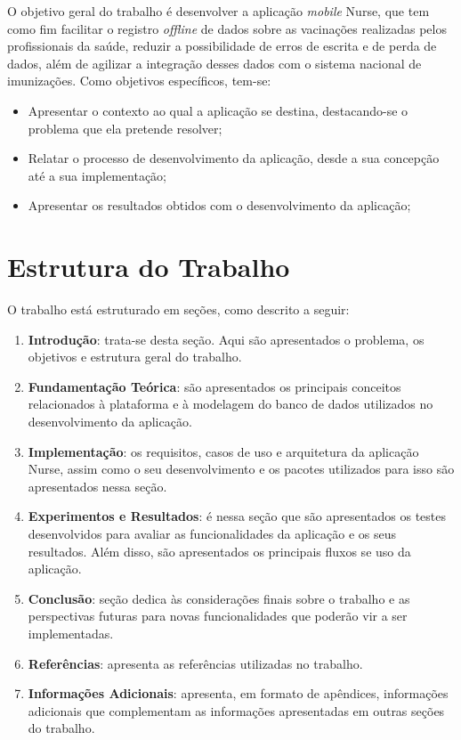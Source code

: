 O objetivo geral do trabalho é desenvolver a aplicação \textit{mobile} Nurse, que tem como fim facilitar o registro \textit{offline} de dados sobre as vacinações realizadas pelos profissionais da saúde, reduzir a possibilidade de erros de escrita e de perda de dados, além de agilizar a integração desses dados com o sistema nacional de imunizações. Como objetivos específicos, tem-se:
\begin{itemize}
  \item Apresentar o contexto ao qual a aplicação se destina, destacando-se o problema que ela pretende resolver;
  \item Relatar o processo de desenvolvimento da aplicação, desde a sua concepção até a sua implementação;
  \item Apresentar os resultados obtidos com o desenvolvimento da aplicação;
\end{itemize}

\section{Estrutura do Trabalho}
\label{cap1:Sec:EstruturaTrabalho}

O trabalho está estruturado em seções, como descrito a seguir: 


  \begin{enumerate}[label=\textbf{Seção \arabic*}]
    \item \textbf{Introdução}: trata-se desta seção. Aqui são apresentados o problema, os objetivos e estrutura geral do trabalho.
    \item \textbf{Fundamentação Teórica}: são apresentados os principais conceitos relacionados à plataforma e à modelagem do banco de dados utilizados no desenvolvimento da aplicação.
    \item \textbf{Implementação}: os requisitos, casos de uso e arquitetura da aplicação Nurse, assim como o seu desenvolvimento e os pacotes utilizados para isso são apresentados nessa seção.
    \item \textbf{Experimentos e Resultados}: é nessa seção que são apresentados os testes desenvolvidos para avaliar as funcionalidades da aplicação e os seus resultados. Além disso, são apresentados os principais fluxos se uso da aplicação.
    \item \textbf{Conclusão}: seção dedica às considerações finais sobre o trabalho e as perspectivas futuras para novas funcionalidades que poderão vir a ser implementadas.
    \item \textbf{Referências}: apresenta as referências utilizadas no trabalho.
    \item \textbf{Informações Adicionais}: apresenta, em formato de apêndices, informações adicionais que complementam as informações apresentadas em outras seções do trabalho.
  \end{enumerate}



